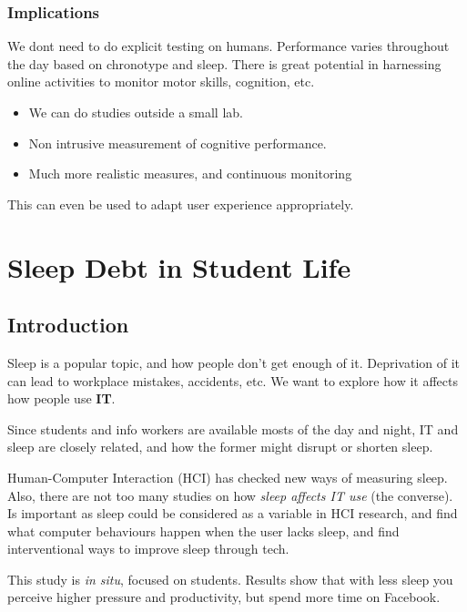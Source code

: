 \documentclass{IEEEtran}
\begin{document}
      \subsubsection{Implications}
        We dont need to do explicit testing on humans. Performance varies throughout the day based on chronotype and sleep. There is great potential in harnessing online activities to monitor motor skills, cognition, etc.
        \begin{itemize}
          \item We can do studies outside a small lab.
          \item Non intrusive measurement of cognitive performance.
          \item Much more realistic measures, and continuous monitoring
        \end{itemize}
        \par This can even be used to adapt user experience appropriately. 
  \section{Sleep Debt in Student Life}
    \subsection{Introduction}
      Sleep is a popular topic, and how people don't get enough of it. Deprivation of it can lead to workplace mistakes, accidents, etc. We want to explore how it affects how people use \textbf{IT}. \par 
      Since students and info workers are available mosts of the day and night, IT and sleep are closely related, and how the former might disrupt or shorten sleep. \par 
      Human-Computer Interaction (HCI) has checked new ways of measuring sleep. Also, there are not too many studies on how \textit{sleep affects IT use} (the converse). Is important as sleep could be considered as a variable in HCI research, and find what computer behaviours happen when the user lacks sleep, and find interventional ways to improve sleep through tech. \par 
      This study is \textit{in situ}, focused on students. Results show that with less sleep you perceive higher pressure and productivity, but spend more time on Facebook. 
\end{document}
